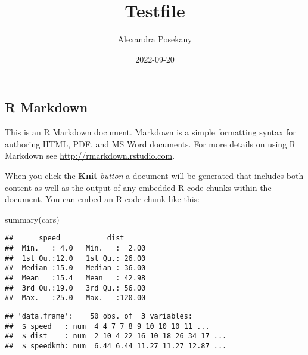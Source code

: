 \documentclass[
]{article}
\title{Testfile}
\author{Alexandra Posekany}
\date{2022-09-20}
\newenvironment{Shaded}{\begin{snugshade}}{\end{snugshade}}
\newcommand{\FloatTok}[1]{\textcolor[rgb]{0.00,0.00,0.81}{#1}}
\newcommand{\FunctionTok}[1]{\textcolor[rgb]{0.00,0.00,0.00}{#1}}
\newcommand{\NormalTok}[1]{#1}
\newcommand{\OtherTok}[1]{\textcolor[rgb]{0.56,0.35,0.01}{#1}}
\newcommand{\SpecialCharTok}[1]{\textcolor[rgb]{0.00,0.00,0.00}{#1}}
\begin{document}
\maketitle

\hypertarget{r-markdown}{%
\subsection{R Markdown}\label{r-markdown}}

This is an R Markdown document. Markdown is a simple formatting syntax
for authoring HTML, PDF, and MS Word documents. For more details on
using R Markdown see \url{http://rmarkdown.rstudio.com}.

When you click the \textbf{Knit} \emph{button} a document will be
generated that includes both content as well as the output of any
embedded R code chunks within the document. You can embed an R code
chunk like this:

\begin{Shaded}
\begin{Highlighting}[]
\FunctionTok{summary}\NormalTok{(cars)}
\end{Highlighting}
\end{Shaded}

\begin{verbatim}
##      speed           dist       
##  Min.   : 4.0   Min.   :  2.00  
##  1st Qu.:12.0   1st Qu.: 26.00  
##  Median :15.0   Median : 36.00  
##  Mean   :15.4   Mean   : 42.98  
##  3rd Qu.:19.0   3rd Qu.: 56.00  
##  Max.   :25.0   Max.   :120.00
\end{verbatim}

\begin{Shaded}
\end{Shaded}

\begin{verbatim}
## 'data.frame':    50 obs. of  3 variables:
##  $ speed   : num  4 4 7 7 8 9 10 10 10 11 ...
##  $ dist    : num  2 10 4 22 16 10 18 26 34 17 ...
##  $ speedkmh: num  6.44 6.44 11.27 11.27 12.87 ...
\end{verbatim}
\end{document}
